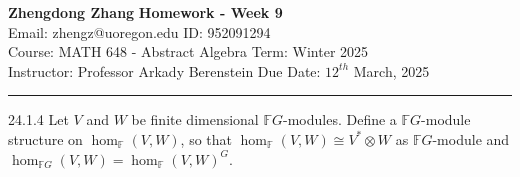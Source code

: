 \documentclass[a4paper, 12pt]{article}
\begin{document}
\noindent
\large\textbf{Zhengdong Zhang} \hfill \textbf{Homework - Week 9}   \\
Email: zhengz@uoregon.edu \hfill ID: 952091294 \\
\normalsize Course: MATH 648 - Abstract Algebra  \hfill Term: Winter 2025\\
Instructor: Professor Arkady Berenstein \hfill Due Date: $12^{th}$ March, 2025 \\
\noindent\rule{7in}{2.8pt}
\begin{problem}{24.1.4}
Let \(V\) and \(W\) be finite dimensional \(\mathbb{F}G\)-modules. Define a \(\mathbb{F}G\)-module structure on \(\hom_\mathbb{F}(V,W)\), so that \(\hom_\mathbb{F}(V,W)\cong V^{*}\otimes W\) as 
\(\mathbb{F}G\)-module and \(\hom_{\mathbb{F}G}(V,W)=\hom_\mathbb{F}(V,W)^G\). 
\end{problem}
\end{document}
